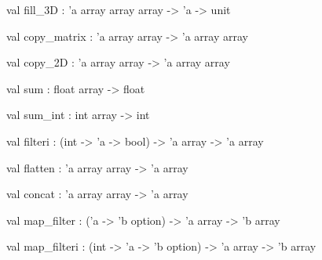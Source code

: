 \documentclass[11pt]{article}
\begin{document}
\begin{ocamldocsigend}
\label{val:Util.A.fill-underscore3D}\begin{ocamldoccode}
val fill_3D : 'a array array array -> 'a -> unit
\end{ocamldoccode}


\label{val:Util.A.copy-underscorematrix}\begin{ocamldoccode}
val copy_matrix : 'a array array -> 'a array array
\end{ocamldoccode}


\label{val:Util.A.copy-underscore2D}\begin{ocamldoccode}
val copy_2D : 'a array array -> 'a array array
\end{ocamldoccode}


\label{val:Util.A.sum}\begin{ocamldoccode}
val sum : float array -> float
\end{ocamldoccode}


\label{val:Util.A.sum-underscoreint}\begin{ocamldoccode}
val sum_int : int array -> int
\end{ocamldoccode}


\label{val:Util.A.filteri}\begin{ocamldoccode}
val filteri : (int -> 'a -> bool) -> 'a array -> 'a array
\end{ocamldoccode}


\label{val:Util.A.flatten}\begin{ocamldoccode}
val flatten : 'a array array -> 'a array
\end{ocamldoccode}


\label{val:Util.A.concat}\begin{ocamldoccode}
val concat : 'a array array -> 'a array
\end{ocamldoccode}


\label{val:Util.A.map-underscorefilter}\begin{ocamldoccode}
val map_filter : ('a -> 'b option) -> 'a array -> 'b array
\end{ocamldoccode}


\label{val:Util.A.map-underscorefilteri}\begin{ocamldoccode}
val map_filteri : (int -> 'a -> 'b option) -> 'a array -> 'b array
\end{ocamldoccode}



\end{ocamldocsigend}
\end{document}
